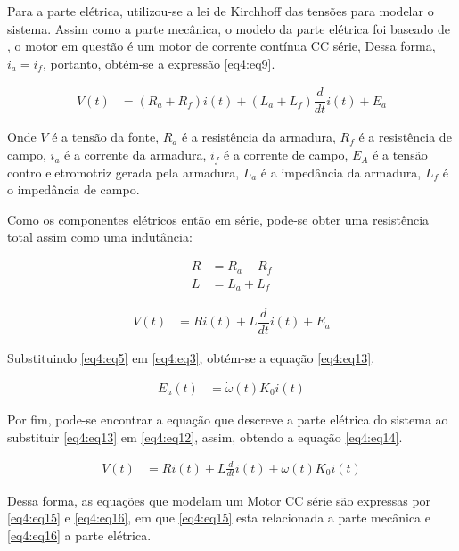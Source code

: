 
Para a parte elétrica, utilizou-se a lei de Kirchhoff das tensões para modelar o sistema. Assim como a parte mecânica, o modelo da parte elétrica foi baseado de \cite{jesus}, o motor em questão é um motor de corrente contínua CC série, Dessa forma, $i_a = i_f$, portanto, obtém-se a expressão \ref{eq4:eq9}.


\begin{align}
	V(t) &= (R_a + R_f)i(t)+ (L_a + L_f)\dfrac{d}{dt}i(t) + E_a \label{eq4:eq9}
\end{align}


Onde $V$ é a tensão da fonte, $R_a$ é a resistência da armadura, $R_f$ é a resistência de campo, $i_a$ é a corrente da armadura, $i_f$ é a corrente de campo, $E_A$ é a tensão contro eletromotriz gerada pela armadura, $L_a$ é a impedância da armadura, $L_f$ é o impedância de campo.


Como os componentes elétricos então em série, pode-se obter uma resistência total assim como uma indutância:

\begin{align}
	R &= R_a + R_f          \label{eq4:eq10}\\        
	L &= L_a + L_f          \label{eq4:eq11}
\end{align}

\begin{align}
	V(t) &= Ri(t)+ L\dfrac{d}{dt}i(t) + E_a \label{eq4:eq12}
\end{align}

Substituindo \ref{eq4:eq5} em \ref{eq4:eq3}, obtém-se a equação \ref{eq4:eq13}.

\begin{align}
	E_a(t) &= \dot{\omega}(t)K_0 i(t) \label{eq4:eq13}
\end{align}

Por fim, pode-se encontrar a equação que descreve a parte elétrica do sistema ao substituir \ref{eq4:eq13} em \ref{eq4:eq12}, assim, obtendo a equação \ref{eq4:eq14}.

\begin{align}
	V(t) &= Ri(t)+ L\frac{d}{dt}i(t) + \dot{\omega}(t)K_0 i(t) \label{eq4:eq14}
\end{align}

Dessa forma, as equações que modelam um Motor CC série são expressas por \ref{eq4:eq15} e \ref{eq4:eq16}, em que \ref{eq4:eq15} esta relacionada a parte mecânica e \ref{eq4:eq16} a parte elétrica.

